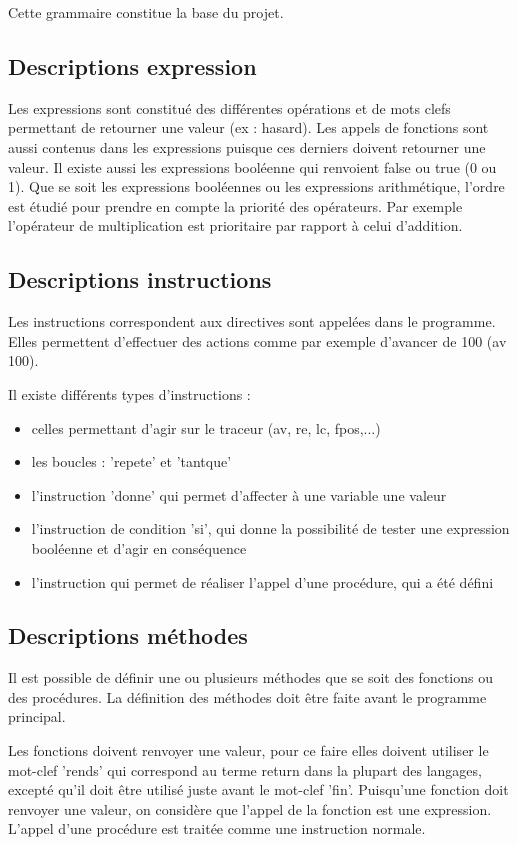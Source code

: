 \documentclass[a4paper,11pt]{article}
\begin{document}
Cette grammaire constitue la base du projet.

\subsection{Descriptions expression}
Les expressions sont constitué des différentes opérations et de mots clefs permettant de retourner une valeur (ex : hasard). Les appels de fonctions sont aussi contenus dans les expressions puisque ces derniers doivent retourner une valeur.
Il existe aussi les expressions booléenne qui renvoient false ou true (0 ou 1).
Que se soit les expressions booléennes ou les expressions arithmétique, l'ordre est étudié pour prendre en compte la priorité des opérateurs. Par exemple l'opérateur de multiplication est prioritaire par rapport à celui d'addition.

\subsection{Descriptions instructions}
Les instructions correspondent aux directives sont appelées dans le programme. Elles permettent d'effectuer des actions comme par exemple d'avancer de 100 (av 100).

Il existe différents types d'instructions :
\begin{itemize}
	\item celles permettant d'agir sur le traceur (av, re, lc, fpos,...)
	\item les boucles : 'repete' et 'tantque'
	\item l'instruction 'donne' qui permet d'affecter à une variable une valeur
	\item l'instruction de condition 'si', qui donne la possibilité de tester une expression booléenne et d'agir en conséquence
	\item l'instruction qui permet de réaliser l'appel d'une procédure, qui a été défini
\end{itemize}

\subsection{Descriptions méthodes}
Il est possible de définir une ou plusieurs méthodes que se soit des fonctions ou des procédures. La définition des méthodes doit être faite avant le programme principal.

Les fonctions doivent renvoyer une valeur, pour ce faire elles doivent utiliser le mot-clef 'rends' qui correspond au terme return dans la plupart des langages, excepté qu'il doit être utilisé juste avant le mot-clef 'fin'.
Puisqu'une fonction doit renvoyer une valeur, on considère que l'appel de la fonction est une expression.
L'appel d'une procédure est traitée comme une instruction normale.
\end{document}
